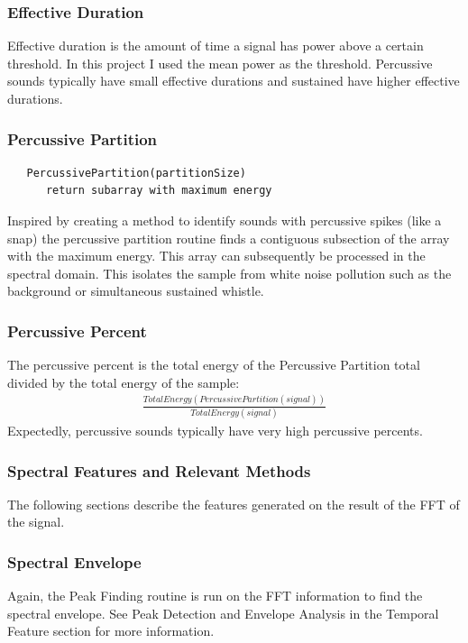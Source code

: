 \documentclass[DIV=calc, paper=a4, fontsize=11pt, twocolumn]{scrartcl}   %
\begin{document}
   \subsubsection{Effective Duration}
      Effective duration is the amount of time a signal has power above a certain threshold. In this project I used the mean power as the threshold. Percussive sounds typically have small effective durations and sustained have higher effective durations.
   \subsubsection{Percussive Partition}
   \begin{lstlisting}
   PercussivePartition(partitionSize)
      return subarray with maximum energy
   \end{lstlisting}

   Inspired by creating a method to identify sounds with percussive spikes (like a snap) the percussive partition routine finds a contiguous subsection of the array with the maximum energy. This array can subsequently be processed in the spectral domain. This isolates the sample from white noise pollution such as the background or simultaneous sustained whistle.

   \subsubsection{Percussive Percent}
   The percussive percent is the total energy of the Percussive Partition total divided by the total energy of the sample:
    \begin{align}
      \frac{TotalEnergy(PercussivePartition(signal))}{ TotalEnergy(signal)}
   \end{align}
   Expectedly, percussive sounds typically have very high percussive percents.

\subsubsection{Spectral Features and Relevant Methods}
The following sections describe the features generated on the result of the FFT of the signal.
   \subsubsection{Spectral Envelope}
   Again, the Peak Finding routine is run on the FFT information to find the spectral envelope. See Peak Detection and Envelope Analysis in the Temporal Feature section for more information.
\end{document}

